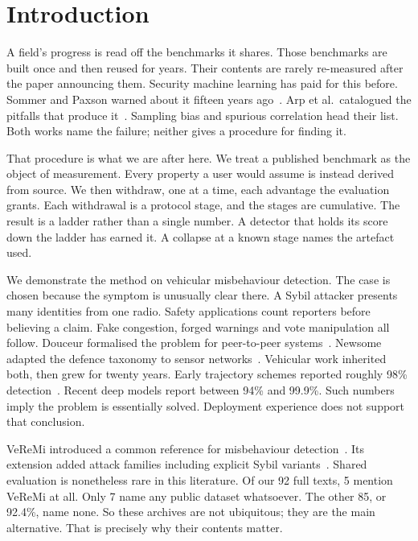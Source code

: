 \documentclass[journal,twoside]{IEEEtran}
\begin{document}
\section{Introduction}

A field's progress is read off the benchmarks it shares.
Those benchmarks are built once and then reused for years.
Their contents are rarely re-measured after the paper announcing them.
Security machine learning has paid for this before.
Sommer and Paxson warned about it fifteen years ago~\cite{sommer2010}.
Arp et al.\ catalogued the pitfalls that produce it~\cite{arp2022}.
Sampling bias and spurious correlation head their list.
Both works name the failure; neither gives a procedure for finding it.

That procedure is what we are after here.
We treat a published benchmark as the object of measurement.
Every property a user would assume is instead derived from source.
We then withdraw, one at a time, each advantage the evaluation grants.
Each withdrawal is a protocol stage, and the stages are cumulative.
The result is a ladder rather than a single number.
A detector that holds its score down the ladder has earned it.
A collapse at a known stage names the artefact used.

We demonstrate the method on vehicular misbehaviour detection.
The case is chosen because the symptom is unusually clear there.
A Sybil attacker presents many identities from one radio.
Safety applications count reporters before believing a claim.
Fake congestion, forged warnings and vote manipulation all follow.
Douceur formalised the problem for peer-to-peer systems~\cite{douceur2002}.
Newsome adapted the defence taxonomy to sensor networks~\cite{newsome2004}.
Vehicular work inherited both, then grew for twenty years.
Early trajectory schemes reported roughly 98\% detection~\cite{chang2011}.
Recent deep models report between 94\% and 99.9\%.
Such numbers imply the problem is essentially solved.
Deployment experience does not support that conclusion.

VeReMi introduced a common reference for misbehaviour detection~\cite{heijden2018}.
Its extension added attack families including explicit Sybil variants~\cite{kamel2020}.
Shared evaluation is nonetheless rare in this literature.
Of our 92 full texts, 5 mention VeReMi at all.
Only 7 name any public dataset whatsoever.
The other 85, or 92.4\%, name none.
So these archives are not ubiquitous; they are the main alternative.
That is precisely why their contents matter.
\end{document}
